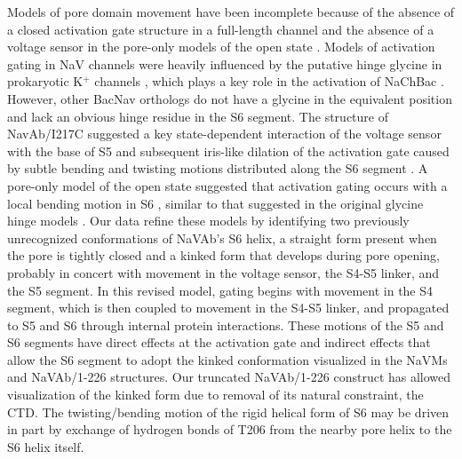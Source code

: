 \begin{refsection}
{Models of pore domain movement have been incomplete because of the absence of a closed activation gate structure in a full-length channel and the absence of a voltage sensor in the pore-only models of the open state \cite{Bagneris:2014eh,Guo:2016jb,Kintzer:2016eu}. Models of activation gating in NaV channels were heavily influenced by the putative hinge glycine in prokaryotic K$^+$ channels \cite{Jiang:2002fx}, which plays a key role in the activation of NaChBac \cite{Zhao:2004vo,Shafrir:2008ic}. However, other BacNav orthologs do not have a glycine in the equivalent position and lack an obvious hinge residue in the S6 segment. The structure of NavAb/I217C suggested a key state-dependent interaction of the voltage sensor with the base of S5 and subsequent iris-like dilation of the activation gate caused by subtle bending and twisting motions distributed along the S6 segment \cite{Payandeh:2012ib}. A pore-only model of the open state suggested that activation gating occurs with a local bending motion in S6 \cite{Bagneris:2014eh}, similar to that suggested in the original glycine hinge models \cite{Zhao:2004vo,Jiang:2002fx,Zhao:2004vv}. Our data refine these models by identifying two previously unrecognized conformations of NaVAb's S6 helix, a straight form present when the pore is tightly closed and a kinked form that develops during pore opening, probably in concert with movement in the voltage sensor, the S4-S5 linker, and the S5 segment. In this revised model, gating begins with movement in the S4 segment, which is then coupled to movement in the S4-S5 linker, and propagated to S5 and S6 through internal protein interactions. These motions of the S5 and S6 segments have direct effects at the activation gate and indirect effects that allow the S6 segment to adopt the kinked conformation visualized in the NaVMs and NaVAb/1-226 structures. Our truncated NaVAb/1-226 construct has allowed visualization of the kinked form due to removal of its natural constraint, the CTD. The twisting/bending motion of the rigid helical form of S6 may be driven in part by exchange of hydrogen bonds of T206 from the nearby pore helix to the S6 helix itself.

}
\end{refsection}
